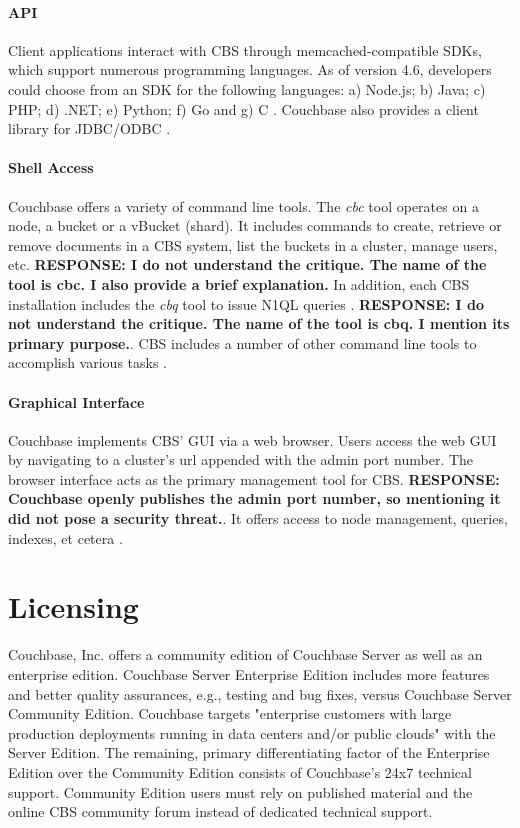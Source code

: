 \documentclass[9pt,twocolumn,twoside]{../../styles/osajnl}
\begin{document}
\paragraph{API}
Client applications interact with CBS through memcached-compatible SDKs, which support numerous programming languages.  As of version 4.6, developers could choose from an SDK for the following languages:  a) Node.js; b) Java; c) PHP; d) .NET; e) Python; f) Go and g) C \cite{www-sdklist-cbsinc}.  Couchbase also provides a client library for JDBC/ODBC \cite{www-downloads-cbsinc}.

\paragraph{Shell Access} Couchbase offers a variety of command line tools.  The \textit{cbc} tool operates on a node, a bucket or a vBucket (shard).  It includes commands to create, retrieve or remove documents in a CBS system, list the buckets in a cluster, manage users, etc.  \textbf{RESPONSE: I do not understand the critique.  The name of the tool is cbc.  I also provide a brief explanation.} In addition, each CBS installation includes the \textit{cbq} tool to issue N1QL queries \cite{www-cli-cbsinc}. \textbf{RESPONSE: I do not understand the critique.  The name of the tool is cbq.  I mention its primary purpose.}.  CBS includes a number of other command line tools to accomplish various tasks \cite{www-cli-intro-cbsinc}.

\paragraph{Graphical Interface} Couchbase implements CBS' GUI via a web browser.  Users access the web GUI by navigating to a cluster's url appended with the admin port number.  The browser interface acts as the primary management tool for CBS.  \textbf{RESPONSE: Couchbase openly publishes the admin port number, so mentioning it did not pose a security threat.}.  It offers access to node management, queries, indexes, et cetera \cite{www-webconsole-cbsinc}.

\section{Licensing}

Couchbase, Inc. offers a community edition of Couchbase
Server as well as an enterprise edition.  Couchbase Server Enterprise Edition includes more features and better quality assurances, e.g., testing and bug fixes, versus Couchbase Server Community Edition.  Couchbase targets "enterprise customers with large production deployments running in data centers and/or public clouds" \cite{www-downloads-cbsinc} with the Server Edition. The remaining, primary differentiating factor of the Enterprise Edition over the Community Edition consists of Couchbase's 24x7 technical support. Community Edition users must rely on published material and the online CBS community forum instead of dedicated technical support. 
\end{document}
